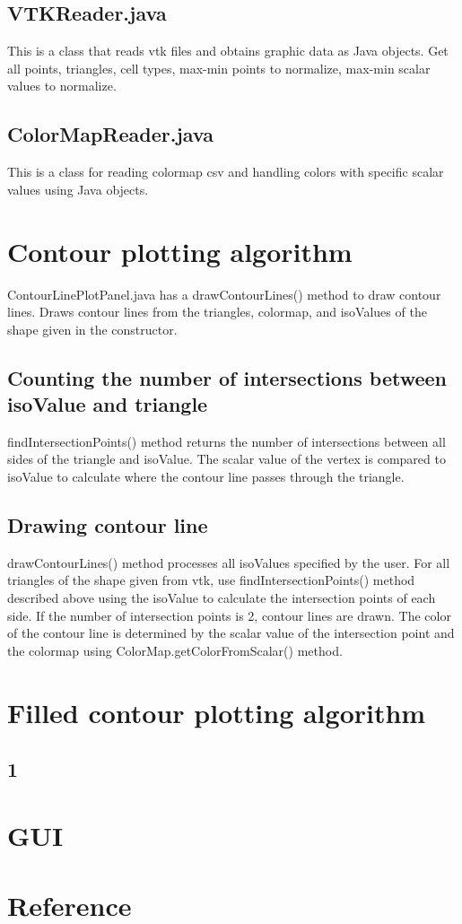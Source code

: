 \documentclass[12pt]{article}
\begin{document}
\subsection{VTKReader.java}
This is a class that reads vtk files and obtains graphic data as Java objects. Get all points, triangles, cell types, max-min points to normalize, max-min scalar values to normalize.
\subsection{ColorMapReader.java}
This is a class for reading colormap csv and handling colors with specific scalar values using Java objects.

\section{Contour plotting algorithm}
ContourLinePlotPanel.java has a drawContourLines() method to draw contour lines. Draws contour lines from the triangles, colormap, and isoValues of the shape given in the constructor.
\subsection{Counting the number of intersections between isoValue and triangle}
findIntersectionPoints() method returns the number of intersections between all sides of the triangle and isoValue. The scalar value of the vertex is compared to isoValue to calculate where the contour line passes through the triangle.
\subsection{Drawing contour line}
drawContourLines() method processes all isoValues specified by the user. For all triangles of the shape given from vtk, use findIntersectionPoints() method described above using the isoValue to calculate the intersection points of each side. If the number of intersection points is 2, contour lines are drawn. The color of the contour line is determined by the scalar value of the intersection point and the colormap using ColorMap.getColorFromScalar() method.

\section{Filled contour plotting algorithm}
\subsection{1}

\section{GUI}

\section{Reference}
\end{document}
